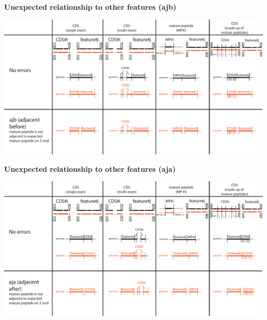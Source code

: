 \documentclass[landscape]{slides}
\begin{document}
\begin{slide}
\begin{center}
\textbf{Unexpected relationship to other features (ajb)}
\vspace{0.5in}

\includegraphics[width=10in]{figs/error-6-ajb}
\end{center}
\vfill
\end{slide}
\begin{slide}
\begin{center}
\textbf{Unexpected relationship to other features (aja)}
\vspace{0.5in}

\includegraphics[width=10in]{figs/error-7-aja}
\end{center}
\vfill
\end{slide}
\end{document}
